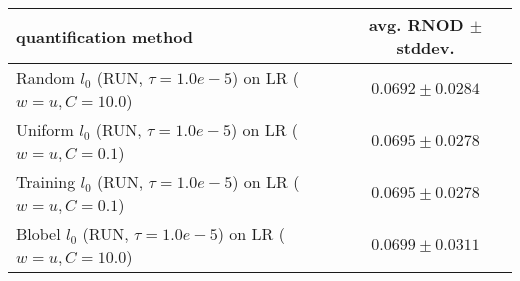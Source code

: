 \begin{tabular}{lc}
  \toprule
  quantification method & avg. RNOD $\pm$ stddev. \\
  \midrule
  Random $l_0$ (RUN, $\tau=1.0e-5$) on LR ($w=u, C=10.0$) & $\mathbf{0.0692 \pm 0.0284}$ \\
  Uniform $l_0$ (RUN, $\tau=1.0e-5$) on LR ($w=u, C=0.1$) & $\mathbf{0.0695 \pm 0.0278}$ \\
  Training $l_0$ (RUN, $\tau=1.0e-5$) on LR ($w=u, C=0.1$) & $\mathbf{0.0695 \pm 0.0278}$ \\
  Blobel $l_0$ (RUN, $\tau=1.0e-5$) on LR ($w=u, C=10.0$) & $0.0699 \pm 0.0311$ \\
  \bottomrule
\end{tabular}
